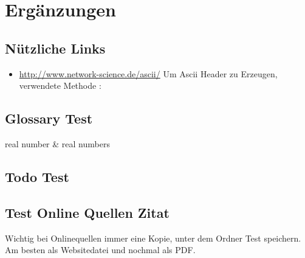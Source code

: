 %

\chapter{Ergänzungen}
	\section{Nützliche Links}
	\begin{itemize}
		\item \url{http://www.network-science.de/ascii/} Um Ascii Header zu Erzeugen, verwendete Methode : 
	\end{itemize}
	
	\section{Glossary Test}
	\gls{real number} \& \glspl{real number}
	
	\section{Todo Test}
	\lipsum[11]
	\lipsum[11]
	\lipsum[11]
	\lipsum[11]
	\lipsum[11]
	
	\section{Test Online Quellen Zitat}
	Wichtig bei Onlinequellen immer eine Kopie, unter dem Ordner Test  speichern. Am besten als Websitedatei und nochmal als PDF.\cite{qs.koeln}